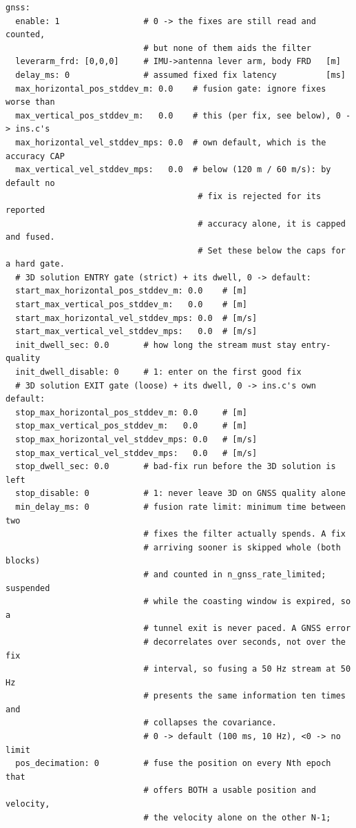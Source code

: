 \documentclass[11pt,a4paper]{article}
\begin{document}
\begin{lstlisting}[style=cfg]
gnss:
  enable: 1                 # 0 -> the fixes are still read and counted,
                            # but none of them aids the filter
  leverarm_frd: [0,0,0]     # IMU->antenna lever arm, body FRD   [m]
  delay_ms: 0               # assumed fixed fix latency          [ms]
  max_horizontal_pos_stddev_m: 0.0    # fusion gate: ignore fixes worse than
  max_vertical_pos_stddev_m:   0.0    # this (per fix, see below), 0 -> ins.c's
  max_horizontal_vel_stddev_mps: 0.0  # own default, which is the accuracy CAP
  max_vertical_vel_stddev_mps:   0.0  # below (120 m / 60 m/s): by default no
                                       # fix is rejected for its reported
                                       # accuracy alone, it is capped and fused.
                                       # Set these below the caps for a hard gate.
  # 3D solution ENTRY gate (strict) + its dwell, 0 -> default:
  start_max_horizontal_pos_stddev_m: 0.0    # [m]
  start_max_vertical_pos_stddev_m:   0.0    # [m]
  start_max_horizontal_vel_stddev_mps: 0.0  # [m/s]
  start_max_vertical_vel_stddev_mps:   0.0  # [m/s]
  init_dwell_sec: 0.0       # how long the stream must stay entry-quality
  init_dwell_disable: 0     # 1: enter on the first good fix
  # 3D solution EXIT gate (loose) + its dwell, 0 -> ins.c's own default:
  stop_max_horizontal_pos_stddev_m: 0.0     # [m]
  stop_max_vertical_pos_stddev_m:   0.0     # [m]
  stop_max_horizontal_vel_stddev_mps: 0.0   # [m/s]
  stop_max_vertical_vel_stddev_mps:   0.0   # [m/s]
  stop_dwell_sec: 0.0       # bad-fix run before the 3D solution is left
  stop_disable: 0           # 1: never leave 3D on GNSS quality alone
  min_delay_ms: 0           # fusion rate limit: minimum time between two
                            # fixes the filter actually spends. A fix
                            # arriving sooner is skipped whole (both blocks)
                            # and counted in n_gnss_rate_limited; suspended
                            # while the coasting window is expired, so a
                            # tunnel exit is never paced. A GNSS error
                            # decorrelates over seconds, not over the fix
                            # interval, so fusing a 50 Hz stream at 50 Hz
                            # presents the same information ten times and
                            # collapses the covariance.
                            # 0 -> default (100 ms, 10 Hz), <0 -> no limit
  pos_decimation: 0         # fuse the position on every Nth epoch that
                            # offers BOTH a usable position and velocity,
                            # the velocity alone on the other N-1;

\end{lstlisting}
\end{document}
